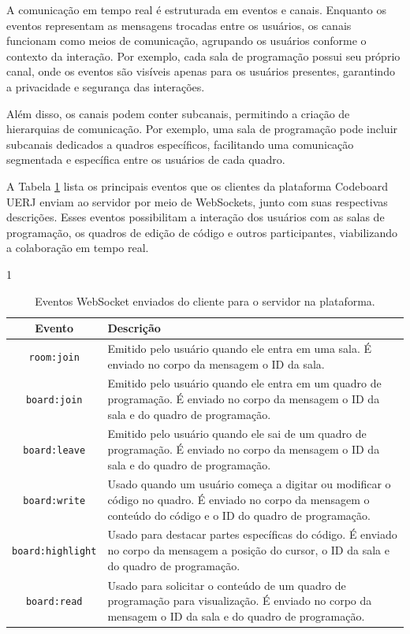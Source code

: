 A comunicação em tempo real é estruturada em eventos e canais. Enquanto os eventos representam as mensagens trocadas entre os usuários, os canais funcionam como meios de comunicação, agrupando os usuários conforme o contexto da interação. Por exemplo, cada sala de programação possui seu próprio canal, onde os eventos são visíveis apenas para os usuários presentes, garantindo a privacidade e segurança das interações.

Além disso, os canais podem conter subcanais, permitindo a criação de hierarquias de comunicação. Por exemplo, uma sala de programação pode incluir subcanais dedicados a quadros específicos, facilitando uma comunicação segmentada e específica entre os usuários de cada quadro.

A Tabela \ref{tab:websocket-client-to-server-events}  lista os principais eventos que os clientes da plataforma Codeboard UERJ enviam ao servidor por meio de WebSockets, junto com suas respectivas descrições. Esses eventos possibilitam a interação dos usuários com as salas de programação, os quadros de edição de código e outros participantes, viabilizando a colaboração em tempo real.

\begin{table}[H]{1\textwidth}
    \centering
    \caption{Eventos WebSocket enviados do cliente para o servidor na plataforma.}
    \label{tab:websocket-client-to-server-events}
    \renewcommand{\arraystretch}{1.3} 
    \begin{tabular}{|c|p{10cm}|}
        \hline
        \textbf{Evento} & \textbf{Descrição} \\
        \hline
        \texttt{room:join} & Emitido pelo usuário quando ele entra em uma sala. É enviado no corpo da mensagem o ID da sala. \\
        \hline
        \texttt{board:join} & Emitido pelo usuário quando ele entra em um quadro de programação. É enviado no corpo da mensagem o ID da sala e do quadro de programação. \\
        \hline
        \texttt{board:leave} & Emitido pelo usuário quando ele sai de um quadro de programação. É enviado no corpo da mensagem o ID da sala e do quadro de programação. \\
        \hline
        \texttt{board:write} & Usado quando um usuário começa a digitar ou modificar o código no quadro. É enviado no corpo da mensagem o conteúdo do código e o ID do quadro de programação. \\
        \hline
        \texttt{board:highlight} & Usado para destacar partes específicas do código. É enviado no corpo da mensagem a posição do cursor, o ID da sala e do quadro de programação. \\
        \hline
        \texttt{board:read} & Usado para solicitar o conteúdo de um quadro de programação para visualização. É enviado no corpo da mensagem o ID da sala e do quadro de programação. \\
        \hline
    \end{tabular}
\end{table}


